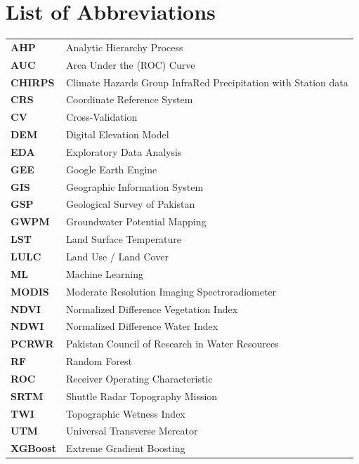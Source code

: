 \chapter*{List of Abbreviations}
\thispagestyle{plain}

\begin{longtable}{p{3.2cm} p{10cm}}
\textbf{AHP}    & Analytic Hierarchy Process \\
\textbf{AUC}    & Area Under the (ROC) Curve \\
\textbf{CHIRPS} & Climate Hazards Group InfraRed Precipitation with Station data \\
\textbf{CRS}    & Coordinate Reference System \\
\textbf{CV}     & Cross-Validation \\
\textbf{DEM}    & Digital Elevation Model \\
\textbf{EDA}    & Exploratory Data Analysis \\
\textbf{GEE}    & Google Earth Engine \\
\textbf{GIS}    & Geographic Information System \\
\textbf{GSP}    & Geological Survey of Pakistan \\
\textbf{GWPM}   & Groundwater Potential Mapping \\
\textbf{LST}    & Land Surface Temperature \\
\textbf{LULC}   & Land Use / Land Cover \\
\textbf{ML}     & Machine Learning \\
\textbf{MODIS}  & Moderate Resolution Imaging Spectroradiometer \\
\textbf{NDVI}   & Normalized Difference Vegetation Index \\
\textbf{NDWI}   & Normalized Difference Water Index \\
\textbf{PCRWR}  & Pakistan Council of Research in Water Resources \\
\textbf{RF}     & Random Forest \\
\textbf{ROC}    & Receiver Operating Characteristic \\
\textbf{SRTM}   & Shuttle Radar Topography Mission \\
\textbf{TWI}    & Topographic Wetness Index \\
\textbf{UTM}    & Universal Transverse Mercator \\
\textbf{XGBoost}& Extreme Gradient Boosting \\
\end{longtable}

\cleardoublepage
